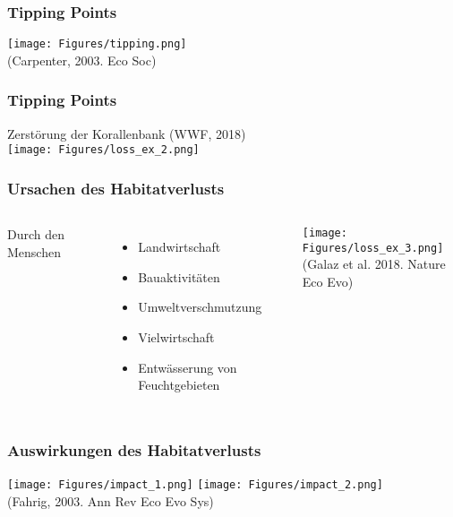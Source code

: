 \documentclass{beamer}
\begin{document}



\begin{frame}
\frametitle{Tipping Points}
\texttt{[image: Figures/tipping.png]}\\
\centering
\tiny (Carpenter, 2003. Eco Soc)
\end{frame}


\begin{frame}
\frametitle{Tipping Points}
Zerstörung der Korallenbank (WWF, 2018)\\[0.5cm]
\texttt{[image: Figures/loss\_ex\_2.png]}
\end{frame}


\begin{frame}
\frametitle{Ursachen des Habitatverlusts}
\begin{columns}
\alert{Durch den Menschen}\\
\begin{itemize}
\item Landwirtschaft
\item Bauaktivitäten
\item Umweltverschmutzung
\item Vielwirtschaft
\item Entwässerung von Feuchtgebieten
\end{itemize}
\hspace{0.5cm}
\raggedleft
\texttt{[image: Figures/loss\_ex\_3.png]}\\
\centering
\tiny (Galaz et al. 2018. Nature Eco Evo)
\end{columns}
\end{frame}


\begin{frame}
\frametitle{Auswirkungen des Habitatverlusts}
\texttt{[image: Figures/impact\_1.png]}
\texttt{[image: Figures/impact\_2.png]}\\
\hspace{2cm} \tiny (Fahrig, 2003. Ann Rev Eco Evo Sys)\\
\normalsize

\end{frame}
\end{document}
